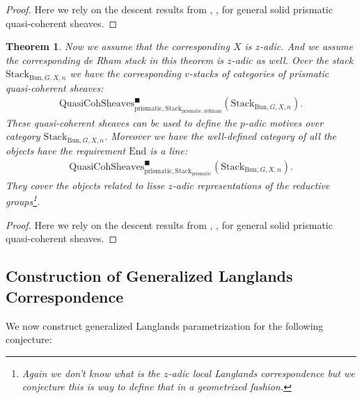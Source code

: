 \documentclass[12pt]{article}
\newtheorem{theorem}{Theorem}
\theoremstyle{definition}
\begin{document}
\begin{proof}
Here we rely on the descent results from \cite{CSA}, \cite{CSB}, \cite{CSC} for general solid prismatic quasi-coherent sheaves.
\end{proof}

\begin{theorem}
Now we assume that the corresponding $X$ is $z$-adic. And we assume the corresponding de Rham stack in this theorem is $z$-adic as well. Over the stack $\mathrm{Stack}_{\mathrm{Bun},G,X,n}$ we have the corresponding $v$-stacks of categories of prismatic quasi-coherent sheaves:
\begin{align}
\mathrm{QuasiCohSheaves}^\blacksquare_{\mathrm{prismatic},\mathrm{Stack}_{\mathrm{prismatic},\mathrm{deRham}}}(\mathrm{Stack}_{\mathrm{Bun},G,X,n}).
\end{align}
These quasi-coherent sheaves can be used to define the $p$-adic motives over category $\mathrm{Stack}_{\mathrm{Bun},G,X,n}$. Moreover we have the well-defined category of all the objects have the requirement $\mathrm{End}$ is a line:
\begin{align}
\mathrm{QuasiCohSheaves}^\blacksquare_{\mathrm{prismatic},\mathrm{Stack}_{\mathrm{prismatic}}}(\mathrm{Stack}_{\mathrm{Bun},G,X,n}).
\end{align}
They cover the objects related to lisse $z$-adic representations of the reductive groups\footnote{Again we don't know what is the $z$-adic local Langlands correspondence but we conjecture this is way to define that in a geometrized fashion.}.
\end{theorem}

\begin{proof}
Here we rely on the descent results from \cite{CSA}, \cite{CSB}, \cite{CSC} for general solid prismatic quasi-coherent sheaves.
\end{proof}





\subsection{Construction of Generalized Langlands Correspondence}

\noindent We now construct generalized Langlands parametrization for the following conjecture:
\end{document}
